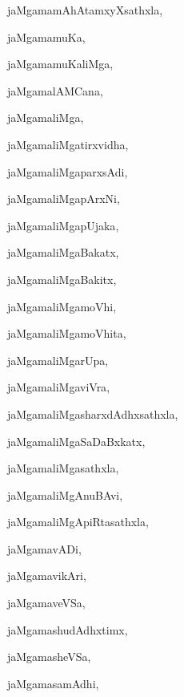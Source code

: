 \begin{multicols}{3}
{\noindent
{jaMgamamAhAtamxyXsathxla}, \pageref{jaMgamamAhAtamxyXsathxla}

\noindent
{jaMgamamuKa}, \pageref{jaMgamamuKa}

\noindent
{jaMgamamuKaliMga}, \pageref{jaMgamamuKaliMga}

\noindent
{jaMgamalAMCana}, \pageref{jaMgamalAMCana}

\noindent
{jaMgamaliMga}, \pageref{jaMgamaliMga}

\noindent
{jaMgamaliMgatirxvidha}, \pageref{jaMgamaliMgatirxvidha}

\noindent
{jaMgamaliMgaparxsAdi}, \pageref{jaMgamaliMgaparxsAdi}

\noindent
{jaMgamaliMgapArxNi}, \pageref{jaMgamaliMgapArxNi}

\noindent
{jaMgamaliMgapUjaka}, \pageref{jaMgamaliMgapUjaka}

\noindent
{jaMgamaliMgaBakatx}, \pageref{jaMgamaliMgaBakatx}

\noindent
{jaMgamaliMgaBakitx}, \pageref{jaMgamaliMgaBakitx}

\noindent
{jaMgamaliMgamoVhi}, \pageref{jaMgamaliMgamoVhi}

\noindent
{jaMgamaliMgamoVhita}, \pageref{jaMgamaliMgamoVhita}

\noindent
{jaMgamaliMgarUpa}, \pageref{jaMgamaliMgarUpa}

\noindent
{jaMgamaliMgaviVra}, \pageref{jaMgamaliMgaviVra}

\noindent
{jaMgamaliMgasharxdAdhxsathxla}, \pageref{jaMgamaliMgasharxdAdhxsathxla}

\noindent
{jaMgamaliMgaSaDaBxkatx}, \pageref{jaMgamaliMgaSaDaBxkatx}

\noindent
{jaMgamaliMgasathxla}, \pageref{jaMgamaliMgasathxla}

\noindent
{jaMgamaliMgAnuBAvi}, \pageref{jaMgamaliMgAnuBAvi}

\noindent
{jaMgamaliMgApiRtasathxla}, \pageref{jaMgamaliMgApiRtasathxla}

\noindent
{jaMgamavADi}, \pageref{jaMgamavADi}

\noindent
{jaMgamavikAri}, \pageref{jaMgamavikAri}

\noindent
{jaMgamaveVSa}, \pageref{jaMgamaveVSa}

\noindent
{jaMgamashudAdhxtimx}, \pageref{jaMgamashudAdhxtimx}

\noindent
{jaMgamasheVSa}, \pageref{jaMgamasheVSa}

\noindent
{jaMgamasamAdhi}, \pageref{jaMgamasamAdhi}

}
\end{multicols}
